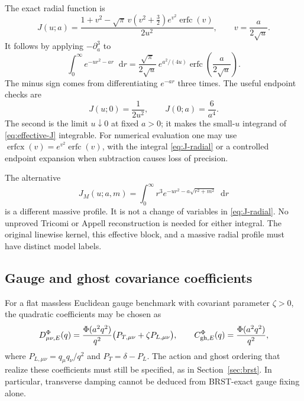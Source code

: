 \documentclass[final,5p,times,twocolumn,numbers,nopreprintline]{elsarticle}
\numberwithin{equation}{section}
\theoremstyle{definition}
\theoremstyle{remark}
\newcommand{\dd}{\mathop{}\!\mathrm d}
\newcommand{\Ph}{\Phi}
\newcommand{\erfc}{\operatorname{erfc}}
\newcommand{\erfcx}{\operatorname{erfcx}}
\begin{document}
The exact radial function is
\begin{equation}
 \boxed{\;
 J(u;a)=\frac{
 1+v^2-\sqrt\pi\,v(v^2+\tfrac32)e^{v^2}\erfc(v)}
 {2u^2},
 \qquad v=\frac{a}{2\sqrt u}.
 \;}
 \label{eq:J-closed}
\end{equation}
It follows by applying \(-\partial_a^3\) to
\[
 \int_0^\infty e^{-ur^2-ar}\dd r
 =\frac{\sqrt\pi}{2\sqrt u}\,
      e^{a^2/(4u)}\erfc\!\left(\frac{a}{2\sqrt u}\right).
\]
The minus sign comes from differentiating \(e^{-ar}\) three times.
The useful endpoint checks are
\begin{equation}
 J(u;0)=\frac1{2u^2},\qquad
 J(0;a)=\frac6{a^4}.
 \label{eq:J-limits}
\end{equation}
The second is the limit \(u\downarrow0\) at fixed \(a>0\);
it makes the small-\(u\) integrand of
\eqref{eq:effective-J} integrable.
For numerical evaluation one may use
\(\erfcx(v)=e^{v^2}\erfc(v)\), with the integral
\eqref{eq:J-radial} or a controlled endpoint expansion when
subtraction causes loss of precision.

The alternative
\[
 J_M(u;a,m)
    =\int_0^\infty r^3e^{-ur^2-a\sqrt{r^2+m^2}}\dd r
\]
is a different massive profile. It is not a change of variables
in \eqref{eq:J-radial}. No unproved Tricomi or Appell
reconstruction is needed for either integral.
The original linewise kernel, this effective block, and a massive
radial profile must have distinct model labels.

\subsection{Gauge and ghost covariance coefficients}

For a flat massless Euclidean gauge benchmark with covariant
parameter \(\zeta>0\), the quadratic coefficients may be chosen as
\begin{equation}
 D_{\mu\nu,E}^{\Ph}(q)
   =\frac{\Ph(a^2q^2)}{q^2}
         \bigl(P_{T,\mu\nu}+\zeta P_{L,\mu\nu}\bigr),
 \qquad
 C_{{\rm gh},E}^{\Ph}(q)=\frac{\Ph(a^2q^2)}{q^2},
 \label{eq:gauge-covariances}
\end{equation}
where \(P_{L,\mu\nu}=q_\mu q_\nu/q^2\) and
\(P_T=\delta-P_L\).
The action and ghost ordering that realize these coefficients
must still be specified, as in
Section~\ref{sec:brst}. In particular, transverse damping cannot
be deduced from BRST-exact gauge fixing alone.
\end{document}
